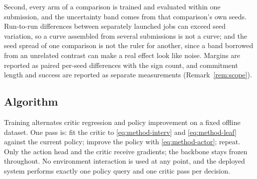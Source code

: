 Second, every arm of a comparison is trained and evaluated within one submission, and the
uncertainty band comes from that comparison's own seeds. Run-to-run differences between separately
launched jobs can exceed seed variation, so a curve assembled from several submissions is not a
curve; and the seed spread of one comparison is not the ruler for another, since a band borrowed
from an unrelated contrast can make a real effect look like noise. Margins are reported as paired
per-seed differences with the sign count, and commitment length and success are reported as
separate measurements (Remark~\ref{rem:scope}).

\subsection{Algorithm}
\label{sec:method:algo}

Training alternates critic regression and policy improvement on a fixed offline dataset. One pass
is: fit the critic to \eqref{eq:method-interv} and \eqref{eq:method-leaf} against the current
policy; improve the policy with \eqref{eq:method-actor}; repeat. Only the action head and the
critic receive gradients; the backbone stays frozen throughout. No environment interaction is used
at any point, and the deployed system performs exactly one policy query and one critic pass per
decision.

